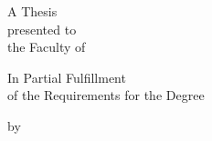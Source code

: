 \begin{titlepage}
\thispagestyle{empty}
\begin{center}
{\MakeUppercase{\ThesisTitle}\par}

\vfill

A Thesis\\[0.5em]
presented to\\[0.5em]
the Faculty of \UniversityName

\vfill

In Partial Fulfillment\\[0.5em]
of the Requirements for the Degree\\[0.5em]
\DegreeName

\vfill

by\\[0.5em]
\ThesisAuthor\\[0.5em]
\SubmissionDate
\end{center}
\end{titlepage}
